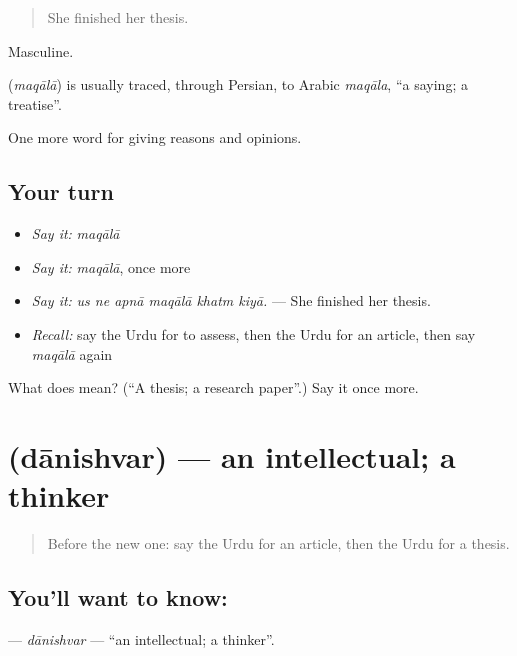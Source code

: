 \begin{quote}
She finished her thesis.
\end{quote}

Masculine.

\begin{cousinweb}
\textbf{} (\emph{maqālā}) is usually traced, through Persian, to Arabic \emph{maqāla}, \textquotedblleft{}a saying; a treatise\textquotedblright{}.
\end{cousinweb}

\begin{grammarlens}[title={What you've built}]
One more word for giving reasons and opinions.
\end{grammarlens}

\subsection*{Your turn}
\begin{itemize}
\raggedright
  \item \emph{Say it:} \emph{maqālā}
  \item \emph{Say it:} \emph{maqālā}, once more
  \item \emph{Say it:} \emph{us ne apnā maqālā khatm kiyā.} — She finished her thesis.
  \item \emph{Recall:} say the Urdu for to assess, then the Urdu for an article, then say \emph{maqālā} again
\end{itemize}

\begin{tcolorbox}[breakable,colback=teal!4,colframe=teal!35!black,title={Before you move on}]
What does  mean? (\textquotedblleft{}A thesis; a research paper\textquotedblright{}.) Say it once more.
\end{tcolorbox}
\section[\texorpdfstring{\ur{دانشور} (dānishvar)}{دانشور (dānishvar)}]{ (dānishvar) — an intellectual; a thinker}

\label{lesson:UR-C352-danishvar}



\begin{quote}
Before the new one: say the Urdu for an article, then the Urdu for a thesis.
\end{quote}

\subsection*{You'll want to know: }
\textbf{} — \emph{dānishvar} — \textquotedblleft{}an intellectual; a thinker\textquotedblright{}.

